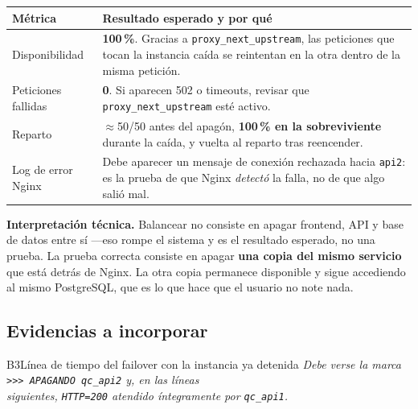 \documentclass[11pt,letterpaper]{article}
\begin{document}
\begin{center}
\begin{tabular}{@{}l p{10.4cm}@{}}
\toprule
\textbf{Métrica} & \textbf{Resultado esperado y por qué} \\
\midrule
Disponibilidad      & \textbf{100\,\%}. Gracias a \texttt{proxy\_next\_upstream}, las peticiones que tocan la instancia caída se reintentan en la otra dentro de la misma petición. \\[4pt]
Peticiones fallidas & \textbf{0}. Si aparecen 502 o timeouts, revisar que \texttt{proxy\_next\_upstream} esté activo. \\[4pt]
Reparto             & $\approx$50/50 antes del apagón, \textbf{100\,\% en la sobreviviente} durante la caída, y vuelta al reparto tras reencender. \\[4pt]
Log de error Nginx  & Debe aparecer un mensaje de conexión rechazada hacia \texttt{api2}: es la prueba de que Nginx \emph{detectó} la falla, no de que algo salió mal. \\
\bottomrule
\end{tabular}
\end{center}

\begin{nota}
\textbf{Interpretación técnica.} Balancear no consiste en apagar frontend, API y
base de datos entre sí —eso rompe el sistema y es el resultado esperado, no una
prueba. La prueba correcta consiste en apagar \textbf{una copia del mismo
servicio} que está detrás de Nginx. La otra copia permanece disponible y sigue
accediendo al mismo PostgreSQL, que es lo que hace que el usuario no note nada.
\end{nota}

\subsection{Evidencias a incorporar}

\begin{captura}{B3}{Línea de tiempo del failover con la instancia ya detenida}
\vspace{2.6cm}
\centering\itshape\color{qcGray}\footnotesize
Debe verse la marca \texttt{>>> APAGANDO qc\_api2} y, en las líneas\\
siguientes, \texttt{HTTP=200} atendido íntegramente por \texttt{qc\_api1}.
\vspace{2.4cm}
\end{captura}
\end{document}
